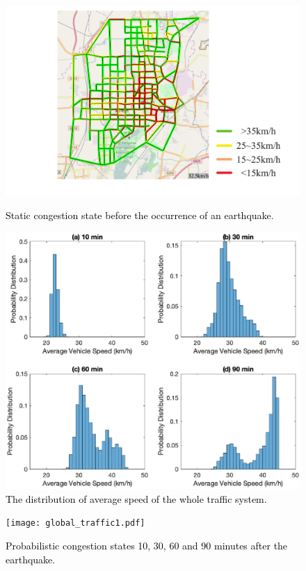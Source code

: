\documentclass[review,11pt,nonatbib]{elsarticle}
\begin{document}
\begin{figure}[!htp]\centering
\includegraphics[width=12cm]{fig3.pdf}\\
\caption{\textcolor{black}{Static congestion state before the occurrence of an earthquake}.}\label{fig3}
\end{figure}

\begin{figure}[!htp]\centering
\includegraphics[width=15cm]{fig4.eps}
\caption{\textcolor{black}{The distribution of average speed of the whole traffic system.}}\label{fig4}
\end{figure}

\begin{figure}[!htp]\centering
\texttt{[image: global\_traffic1.pdf]}\\
\caption{\textcolor{black}{Probabilistic congestion states 10, 30, 60 and 90 minutes after the earthquake. }}\label{fig5}
\end{figure}
\end{document}
